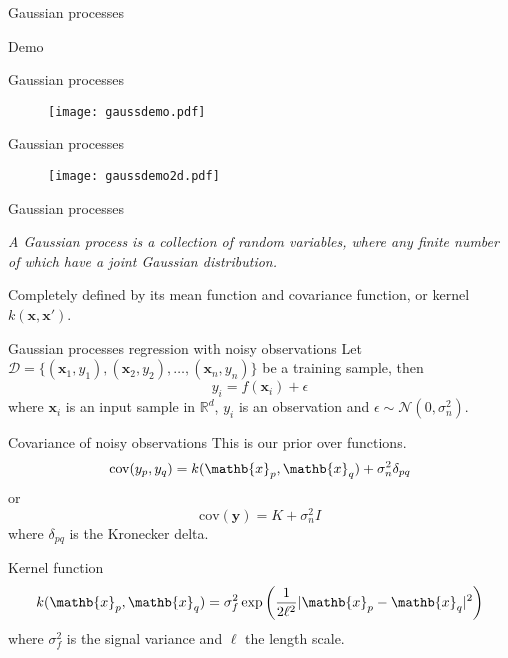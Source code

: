 \documentclass{beamer}
\begin{document}
\begin{frame}{Gaussian processes}
  \begin{center}
    \Large Demo
  \end{center}
\end{frame}

\begin{frame}{Gaussian processes}
  \begin{figure}
    \centering
    \texttt{[image: gaussdemo.pdf]}
  \end{figure}
\end{frame}

\begin{frame}{Gaussian processes}
  \begin{figure}
    \centering
    \texttt{[image: gaussdemo2d.pdf]}
  \end{figure}
\end{frame}

\begin{frame}{Gaussian processes}
  \begin{definition}
    \textit{A Gaussian process is a collection of random variables, where any
      finite number of which have a joint Gaussian distribution.}
  \end{definition}
  Completely defined by its mean function and covariance function, or kernel
  $k(\mathbf{x}, \mathbf{x}')$.
\end{frame}

\begin{frame}{Gaussian processes regression with noisy observations}
  Let
  $\mathcal{D}=\{(\mathbf{x}_1,y_1),(\mathbf{x}_2,y_2),\dots,(\mathbf{x}_n,y_n)\}$
  be a training sample, then
  \[
    y_i = f(\mathbf{x}_i) + \epsilon
  \]
  where $\mathbf{x}_i$ is an input sample in $\mathbb{R}^d$, $y_i$ is an
  observation and $\epsilon \sim \mathcal{N}(0, \sigma_n^2)$.
\end{frame}

\begin{frame}{Covariance of noisy observations}
  This is our prior over functions.
  \[
  \mathrm{cov}(y_p, y_q) = k(\mathb{x}_p, \mathb{x}_q) + \sigma_n^2 \delta_{pq}
  \]
  or
  \[
  \mathrm{cov}(\mathbf{y}) = K + \sigma^2_nI
  \]
  where $\delta_{pq}$ is the Kronecker delta.
\end{frame}

\begin{frame}{Kernel function}
  \[
     k(\mathb{x}_p, \mathb{x}_q) =
     \sigma_f^2 \exp\left(\frac{1}{2\ell^2}|\mathb{x}_p - \mathb{x}_q|^2\right)
  \]
  where $\sigma_f^2$ is the signal variance and $\ell$ the length scale.
\end{frame}
\end{document}
